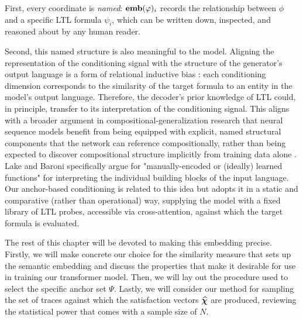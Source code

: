 \documentclass[titlepage,a4paper,11pt]{report}
\begin{document}
    First, every coordinate is \emph{named}: $\textbf{emb}(\varphi)_i$ records the relationship between $\phi$ and a specific LTL formula $\psi_i$, which can be written down, inspected, and reasoned about by any human reader. 
    
    Second, this named structure is also meaningful to the model. Aligning the representation of the conditioning signal with the structure of the generator's output language is a form of relational inductive bias \citep{battaglia_relational_2018}: each conditioning dimension corresponds to the similarity of the target formula to an entity in the model's output language. Therefore, the decoder's prior knowledge of LTL could, in principle, transfer to its interpretation of the conditioning signal. This aligns with a broader argument in compositional-generalization research that neural sequence models benefit from being equipped with explicit, named structural components that the network can reference compositionally, rather than being expected to discover compositional structure implicitly from training data alone \citep{lake_building_2017, lake_generalization_2018}. Lake and Baroni \citep{lake_generalization_2018} specifically argue for "manually-encoded or (ideally) learned functions" for interpreting the individual building blocks of the input language. Our anchor-based conditioning is related to this idea but adopts it in a static and comparative (rather than operational) way, supplying the model with a fixed library of LTL probes, accessible via cross-attention, against which the target formula is evaluated. 
    
    The rest of this chapter will be devoted to making this embedding precise. Firstly, we will make concrete our choice for the similarity measure that sets up the semantic embedding and discuss the properties that make it desirable for use in training our transformer model. Then, we will lay out the procedure used to select the specific anchor set $\Psi$. Lastly, we will consider our method for sampling the set of traces against which the satisfaction vectors $\bm{\widehat\chi}$ are produced, reviewing the statistical power that comes with a sample size of $N$.
\end{document}
